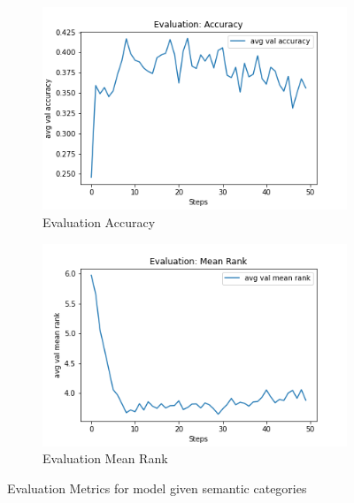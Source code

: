 
\begin{figure}[ht!]
     \centering
     \begin{subfigure}[b]{0.4\textwidth}
         \centering
         \includegraphics[width=\textwidth]{./figure/results/semantic_categories/eval/avg val accuracy.png}
         \caption{Evaluation Accuracy}
         \label{fig:category_accuracy}
     \end{subfigure}
     \hfill
     \begin{subfigure}[b]{0.4\textwidth}
         \centering
         \includegraphics[width=\textwidth]{./figure/results/semantic_categories/eval/avg val mean rank.png}
         \caption{Evaluation Mean Rank}
         \label{fig:category_mean_rank}
     \end{subfigure}
     \caption{Evaluation Metrics for model given semantic categories}
     \label{fig:category_metrics}
\end{figure}

